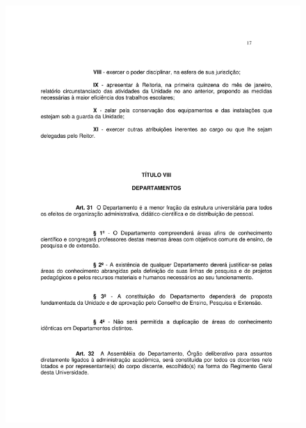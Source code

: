 \begin{figure}[p]
	\centering 
	\includegraphics[scale=0.7]{capitulos/resolucoes/cuni414/cuni414-17.pdf}
\end{figure} \pagebreak

